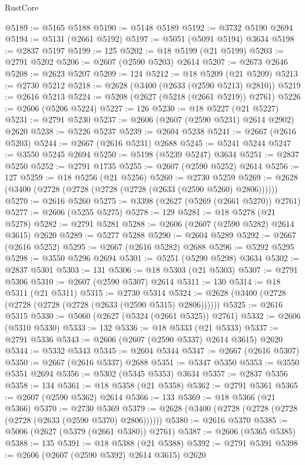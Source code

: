 \begin{lexlean}{RustCore}
\begin{coremodule}
@5189 := @5165 @5188
@5190 := @5148 @5189
@5192 := @3732 @5190 @2694
@5194 := @5131 (@2661 @5192)
@5197 := @5051 (@5091 @5194) @3634
@5198 := @2837 @5197
@5199 := 125
@5202 := @18 @5199 (@21 @5199)
@5203 := @2791 @5202
@5206 := @2607 (@2590 @5203) @2614
@5207 := @2673 @2646
@5208 := @2623 @5207
@5209 := 124
@5212 := @18 @5209 (@21 @5209)
@5213 := @2730 @5212
@5218 := @2628 (@3400 (@2633 (@2590 @5213) @2810))
@5219 := @2616 @5213
@5224 := @5208 (@2627 (@5218 (@2661 @5219)) @2761)
@5226 := @2606 (@5206 @5224)
@5227 := 126
@5230 := @18 @5227 (@21 @5227)
@5231 := @2791 @5230
@5237 := @2606 (@2607 (@2590 @5231) @2614 @2902) @2620
@5238 := @5226 @5237
@5239 := @2604 @5238
@5241 := @2667 (@2616 @5203)
@5244 := @2667 (@2616 @5231) @2688
@5245 := @5241 @5244
@5247 := @3550 @5245 @2694
@5250 := @5198 (@5239 @5247) @3634
@5251 := @2837 @5250
@5252 := @2791 @1735
@5255 := @2607 (@2590 @5252) @2614
@5256 := 127
@5259 := @18 @5256 (@21 @5256)
@5260 := @2730 @5259
@5269 := @2628 (@3400 (@2728 (@2728 (@2728 (@2728 (@2633 (@2590 @5260) @2806))))))
@5270 := @2616 @5260
@5275 := @3398 (@2627 (@5269 (@2661 @5270)) @2761)
@5277 := @2606 (@5255 @5275)
@5278 := 129
@5281 := @18 @5278 (@21 @5278)
@5282 := @2791 @5281
@5288 := @2606 (@2607 (@2590 @5282) @2614 @3615) @2620
@5289 := @5277 @5288
@5290 := @2604 @5289
@5292 := @2667 (@2616 @5252)
@5295 := @2667 (@2616 @5282) @2688
@5296 := @5292 @5295
@5298 := @3550 @5296 @2694
@5301 := @5251 (@5290 @5298) @3634
@5302 := @2837 @5301
@5303 := 131
@5306 := @18 @5303 (@21 @5303)
@5307 := @2791 @5306
@5310 := @2607 (@2590 @5307) @2614
@5311 := 130
@5314 := @18 @5311 (@21 @5311)
@5315 := @2730 @5314
@5324 := @2628 (@3400 (@2728 (@2728 (@2728 (@2728 (@2633 (@2590 @5315) @2806))))))
@5325 := @2616 @5315
@5330 := @5060 (@2627 (@5324 (@2661 @5325)) @2761)
@5332 := @2606 (@5310 @5330)
@5333 := 132
@5336 := @18 @5333 (@21 @5333)
@5337 := @2791 @5336
@5343 := @2606 (@2607 (@2590 @5337) @2614 @3615) @2620
@5344 := @5332 @5343
@5345 := @2604 @5344
@5347 := @2667 (@2616 @5307)
@5350 := @2667 (@2616 @5337) @2688
@5351 := @5347 @5350
@5353 := @3550 @5351 @2694
@5356 := @5302 (@5345 @5353) @3634
@5357 := @2837 @5356
@5358 := 134
@5361 := @18 @5358 (@21 @5358)
@5362 := @2791 @5361
@5365 := @2607 (@2590 @5362) @2614
@5366 := 133
@5369 := @18 @5366 (@21 @5366)
@5370 := @2730 @5369
@5379 := @2628 (@3400 (@2728 (@2728 (@2728 (@2728 (@2633 (@2590 @5370) @2806))))))
@5380 := @2616 @5370
@5385 := @5006 (@2627 (@5379 (@2661 @5380)) @2761)
@5387 := @2606 (@5365 @5385)
@5388 := 135
@5391 := @18 @5388 (@21 @5388)
@5392 := @2791 @5391
@5398 := @2606 (@2607 (@2590 @5392) @2614 @3615) @2620

\end{coremodule}
\end{lexlean}

